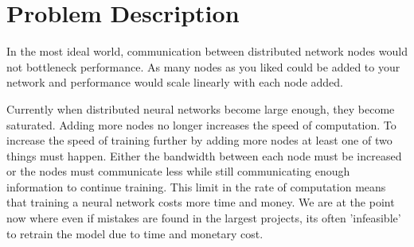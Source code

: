\clearpage
\section{Problem Description}

In the most ideal world, communication between distributed network nodes would
not bottleneck performance. As many nodes as you liked could be added to your
network and performance would scale linearly with each node added.



Currently when distributed neural networks become large enough, they become
saturated. Adding more nodes no longer increases the speed of computation. To
increase the speed of training further by adding more nodes at least one of two
things must happen. Either the bandwidth between each node must be increased or
the nodes must communicate less while still communicating enough information to
continue training.\cite{li2014communication}\cite{SunTimeDataflow} This limit in
the rate of computation means that training a neural network costs more time and
money. We are at the point now where even if mistakes are found in the largest
projects, its often 'infeasible' to retrain the model due to time and monetary
cost. \cite{fewshowlearners2020gpt}

